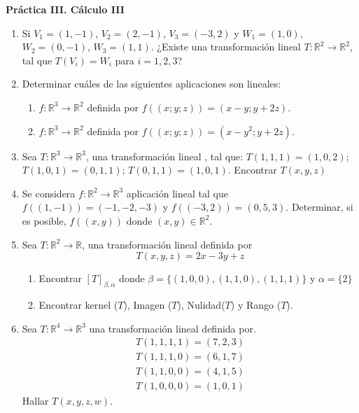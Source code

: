 \documentclass[12pt,letterpaper]{article}
\begin{document}
\begin{center}
    {\Large \bf Práctica III. Cálculo III}
\end{center}

\begin{enumerate}
  \item Si $V_1 = (1,-1)$, $V_2 = (2,-1)$, $V_3=(-3,2)$ y $W_1=(1,0)$, $W_2=(0,-1)$, $W_3=(1,1)$. ¿Existe una transformación lineal $T: \mathbb{R}^2\to\mathbb{R}^2$, tal que $T(V_i) = W_i$ para $i=1,2,3$?
  \item Determinar cuáles de las siguientes aplicaciones son lineales:
  \begin{enumerate}
    \item $f : \mathbb{R}^3\to\mathbb{R}^2$ definida por $f((x; y; z)) = (x - y; y + 2z)$.
    \item $f : \mathbb{R}^3\to\mathbb{R}^2$ definida por $f((x; y; z)) = (x - y^2; y + 2z)$.
  \end{enumerate}
  \item Sea $T: \mathbb{R}^3\to\mathbb{R}^3$, una transformación lineal , tal que: $T (1,1,1) = (1,0,2)$; $T( 1,0,1) = (0,1,1)$; $T ( 0,1,1) = ( 1,0,1)$. Encontrar $T(x,y,z)$
  \item Se considera $f : \mathbb{R}^2\to\mathbb{R}^3$ aplicación lineal tal que $f((1,-1)) = (-1,-2,-3)$ y $f((-3, 2)) = (0, 5, 3)$. Determinar, si es posible, $f((x, y))$ donde $(x, y) \in \mathbb{R}^2$.
  \item Sea $T: \mathbb{R}^2\to\mathbb{R}$, una transformación lineal definida por
  $$
  T (x,y,z) = 2x -3y + z
  $$
  \begin{enumerate}
    \item Encontrar $[T]_{\beta,\alpha}$ donde $\beta = \{(1,0,0),(1,1,0),(1,1,1)\}$ y $\alpha =\{2\}$
    \item  Encontrar kernel ($T$), Imagen ($T$), Nulidad($T$) y Rango ($T$).
  \end{enumerate}
  \item Sea $T: \mathbb{R}^4\to\mathbb{R}^3$ una transformación lineal definida por.
  \begin{align*}
    T(1,1,1,1) = (7,2,3)\\
    T(1,1,1,0) =(6,1,7)\\
    T(1,1,0,0) = (4,1,5)\\
    T(1,0,0,0) = (1,0,1)
  \end{align*}
  Hallar $T( x,y,z,w)$.
\end{enumerate}
\end{document}
